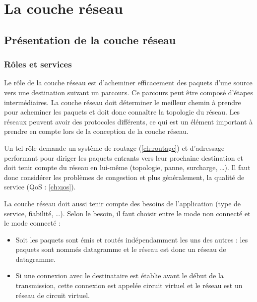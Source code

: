 \chapter{La couche réseau}\label{ch:couchereseau}

\section{Présentation de la couche réseau}

	\subsection{Rôles et services}

		Le rôle de la couche réseau est d’acheminer efficacement des paquets d’une source vers une destination suivant un parcours. Ce parcours peut être composé d’étapes intermédiaires. La couche réseau doit déterminer le meilleur chemin à prendre pour acheminer les paquets et doit donc connaître la topologie du réseau. Les réseaux peuvent avoir des protocoles différents, ce qui est un élément important à prendre en compte lors de la conception de la couche réseau.
        \medskip
        
		Un tel rôle demande un système de routage (\ref{ch:routage}) et d’adressage performant pour diriger les paquets entrants vers leur prochaine destination et doit tenir compte du réseau en lui-même (topologie, panne, surcharge, …). Il faut donc considérer les problèmes de congestion et plus généralement, la qualité de service (QoS : \ref{ch:qos}). 
        \medskip
        
		La couche réseau doit aussi tenir compte des besoins de l’application (type de service, fiabilité, …). Selon le besoin, il faut choisir entre le mode non connecté et le mode connecté : 
        \begin{itemize}
        \item Soit les paquets sont émis et routés indépendamment les uns des autres : les paquets sont nommés datagramme et le réseau est donc un réseau de datagramme.
		\item Si une connexion avec le destinataire est établie avant le début de la transmission, cette connexion est appelée circuit virtuel et le réseau est un réseau de circuit virtuel.
        \end{itemize}
        
